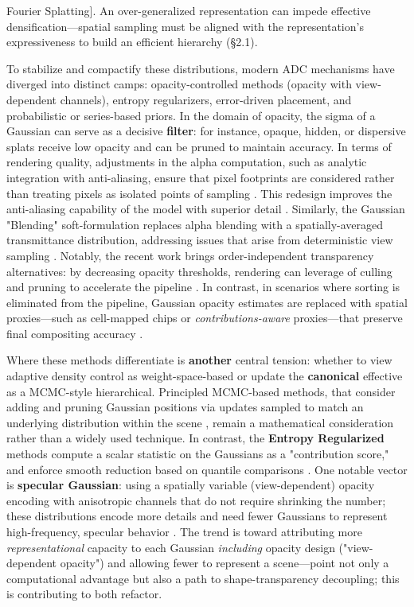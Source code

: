 \documentclass[11pt,a4paper]{article}
\begin{document}
Fourier Splatting]. An over-generalized representation can impede effective densification---spatial sampling must be aligned with the representation's expressiveness to build an efficient hierarchy (\S{}2.1).

To stabilize and compactify these distributions, modern ADC mechanisms have diverged into distinct camps: opacity-controlled methods (opacity with view-dependent channels), entropy regularizers, error-driven placement, and probabilistic or series-based priors. In the domain of opacity, the sigma of a Gaussian can serve as a decisive \textbf{filter}: for instance, opaque, hidden, or dispersive splats receive low opacity and can be pruned to maintain accuracy. In terms of rendering quality, adjustments in the alpha computation, such as analytic integration with anti-aliasing, ensure that pixel footprints are considered rather than treating pixels as isolated points of sampling \cite{arxiv:2403.11056v2}. This redesign improves the anti-aliasing capability of the model with superior detail \cite{arxiv:2403.11056v2}. Similarly, the Gaussian "Blending" soft-formulation replaces alpha blending with a spatially-averaged transmittance distribution, addressing issues that arise from deterministic view sampling \cite{arxiv:2511.15102v1,arxiv:2412.03378v3}. Notably, the recent work brings order-independent transparency alternatives: by decreasing opacity thresholds, rendering can leverage of culling and pruning to accelerate the pipeline \cite{arxiv:2606.04168v1}. In contrast, in scenarios where sorting is eliminated from the pipeline, Gaussian opacity estimates are replaced with spatial proxies---such as cell-mapped chips or \emph{contributions-aware} proxies---that preserve final compositing accuracy \cite{arxiv:1504.02587v1,arxiv:2506.02751v3,arxiv:2410.18931v2}.

Where these methods differentiate is \textbf{another} central tension: whether to view adaptive density control as weight-space-based or update the \textbf{canonical} effective as a MCMC-style hierarchical. Principled MCMC-based methods, that consider adding and pruning Gaussian positions via updates sampled to match an underlying distribution within the scene \cite{arxiv:2012.05766v4}, remain a mathematical consideration rather than a widely used technique. In contrast, the \textbf{Entropy Regularized} methods compute a scalar statistic on the Gaussians as a "contribution score," and enforce smooth reduction based on quantile comparisons \cite{arxiv:2606.29379v1}. One notable vector is \textbf{specular Gaussian}: using a spatially variable (view-dependent) opacity encoding with anisotropic channels that do not require shrinking the number; these distributions encode more details and need fewer Gaussians to represent high-frequency, specular behavior \cite{arxiv:2311.17910v1}. The trend is toward attributing more \emph{representational} capacity to each Gaussian \emph{including} opacity design ("view-dependent opacity") and allowing fewer to represent a scene---point not only a computational advantage but also a path to shape-transparency decoupling; this is contributing to both refactor.
\end{document}
